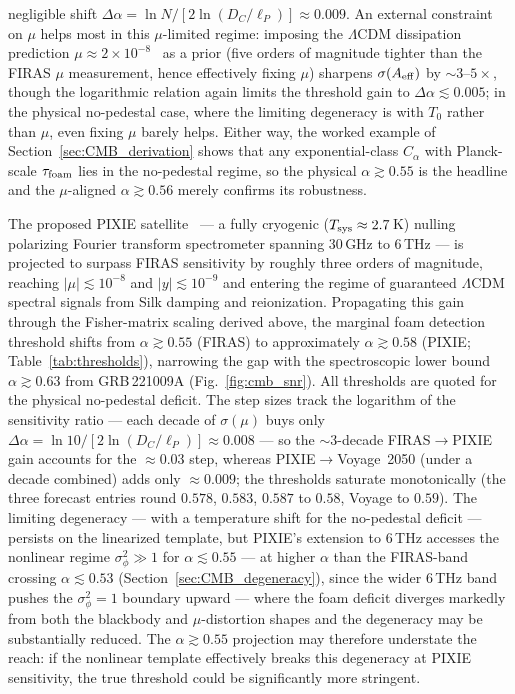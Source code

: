 \documentclass[aps,prd,onecolumn,amsmath,amssymb]{revtex4-2}
\begin{document}
negligible shift $\Delta\alpha=\ln N/[2\ln(D_C/\ell_P)]\approx 0.009$.
An external constraint on $\mu$ helps most in this $\mu$-limited regime: imposing the $\Lambda$CDM dissipation prediction
$\mu\approx 2\times10^{-8}$~\cite{Chluba2021} as a prior (five orders
of magnitude tighter than the FIRAS $\mu$ measurement, hence
effectively fixing $\mu$) sharpens $\sigma(A_{\rm eff})$ by
$\sim 3$--$5\times$, though the logarithmic relation again limits the
threshold gain to $\Delta\alpha\lesssim 0.005$; in the physical
no-pedestal case, where the limiting degeneracy is with $T_0$ rather
than $\mu$, even fixing $\mu$ barely helps.  Either way, the worked
example of Section~\ref{sec:CMB_derivation} shows that any
exponential-class $C_\alpha$ with Planck-scale $\tau_{\rm foam}$ lies
in the no-pedestal regime, so the physical $\alpha\gtrsim 0.55$ is the
headline and the $\mu$-aligned $\alpha\gtrsim 0.56$ merely confirms its
robustness.

The proposed PIXIE satellite~\cite{Kogut2011} --- a fully cryogenic
($T_{\rm sys}\approx2.7$\,K) nulling polarizing Fourier transform spectrometer
spanning $30$\,GHz to $6$\,THz --- is projected to surpass FIRAS sensitivity
by roughly three orders of magnitude, reaching $|\mu|\lesssim10^{-8}$ and
$|y|\lesssim10^{-9}$ and entering the regime of guaranteed $\Lambda$CDM
spectral signals from Silk damping and reionization.
Propagating this gain through the Fisher-matrix scaling derived above,
the marginal foam detection threshold shifts from
$\alpha\gtrsim0.55$ (FIRAS) to approximately $\alpha\gtrsim0.58$
(PIXIE; Table~\ref{tab:thresholds}), narrowing the gap with the
spectroscopic lower bound $\alpha\gtrsim0.63$ from GRB\,221009A
(Fig.~\ref{fig:cmb_snr}).  All thresholds are quoted for the physical
no-pedestal deficit.  The step sizes track the logarithm of the
sensitivity ratio --- each decade of $\sigma(\mu)$ buys only
$\Delta\alpha=\ln10/[2\ln(D_C/\ell_P)]\approx0.008$ --- so the
$\sim\!3$-decade FIRAS$\to$PIXIE gain accounts for the $\approx0.03$
step, whereas PIXIE$\to$Voyage~2050 (under a decade combined) adds only
$\approx0.009$; the thresholds saturate monotonically (the three forecast
entries round $0.578$, $0.583$, $0.587$ to $0.58$, Voyage to $0.59$).
The limiting degeneracy --- with a temperature shift for the
no-pedestal deficit --- persists on the linearized template, but
PIXIE's extension to $6$\,THz accesses the nonlinear regime
$\sigma_\phi^2\gg1$ for $\alpha\lesssim0.55$ --- at higher $\alpha$ than
the FIRAS-band crossing $\alpha\lesssim0.53$
(Section~\ref{sec:CMB_degeneracy}), since the wider $6$\,THz band pushes
the $\sigma_\phi^2=1$ boundary upward --- where the foam deficit
diverges markedly from both the blackbody and $\mu$-distortion shapes
and the degeneracy may be substantially reduced.  The
$\alpha\gtrsim0.55$ projection may therefore understate the reach: if
the nonlinear template effectively breaks this degeneracy at PIXIE
sensitivity, the true threshold could be significantly more stringent.
\end{document}
